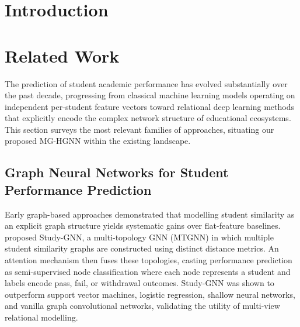 \documentclass[sigconf]{acmart}
\begin{document}
\maketitle

\section{Introduction}
\label{sec:intro}
\lipsum[1-2]

\section{Related Work}
\label{sec:related}

The prediction of student academic performance has evolved substantially over the
past decade, progressing from classical machine learning models operating on
independent per-student feature vectors toward relational deep learning methods
that explicitly encode the complex network structure of educational ecosystems.
This section surveys the most relevant families of approaches, situating our
proposed MG-HGNN within the existing landscape.

\subsection{Graph Neural Networks for Student Performance Prediction}

Early graph-based approaches demonstrated that modelling student similarity as an
explicit graph structure yields systematic gains over flat-feature baselines.
\citet{li2022studygnn} proposed Study-GNN, a multi-topology GNN (MTGNN) in which
multiple student similarity graphs are constructed using distinct distance
metrics. An attention mechanism then fuses these topologies, casting performance
prediction as semi-supervised node classification where each node represents a
student and labels encode pass, fail, or withdrawal outcomes. Study-GNN was shown
to outperform support vector machines, logistic regression, shallow neural
networks, and vanilla graph convolutional networks, validating the utility of
multi-view relational modelling.
\end{document}
